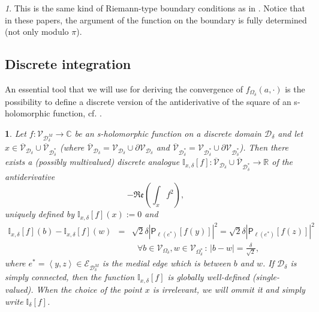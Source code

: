 \documentclass[oneside,english]{amsart}
\numberwithin{equation}{section}
\numberwithin{figure}{section}
\theoremstyle{plain}
\theoremstyle{plain}
\theoremstyle{plain}
\theoremstyle{plain}
\newtheorem{prop}[thm]{\protect\propositionname}
\theoremstyle{plain}
\theoremstyle{definition}
\theoremstyle{remark}
\newtheorem{rem}[thm]{\protect\remarkname}
\providecommand{\propositionname}{Proposition}
\providecommand{\remarkname}{Remark}
\begin{document}
\begin{rem}
This is the same kind of Riemann-type boundary conditions as in \cite{smirnov-ii,chelkak-smirnov-ii}.
Notice that in these papers, the argument of the function on the boundary
is fully determined (not only modulo $\pi$).
\end{rem}

\subsection{Discrete integration}

An essential tool that we will use for deriving the convergence of
$f_{\Omega_{\delta}}\left(a,\cdot\right)$ is the possibility to define
a discrete version of the antiderivative of the square of an s-holomorphic
function, cf. \cite{smirnov-ii}.
\begin{prop}
\label{pro:integral-of-the-square}Let $f:\mathcal{V}_{\mathcal{D}_{\delta}^{M}}\to\mathbb{C}$
be an s-holomorphic function on a discrete domain $\mathcal{D}_{\delta}$
and let $x\in\overline{\mathcal{V}}_{\mathcal{D}_{\delta}}\cup\overline{\mathcal{V}}_{\mathcal{D}_{\delta}^{*}}$
(where $\overline{\mathcal{V}}_{\mathcal{D}_{\delta}}=\mathcal{V}_{\mathcal{D}_{\delta}}\cup\partial\mathcal{V}_{\mathcal{D}_{\delta}}$
and $\overline{\mathcal{V}}_{\mathcal{D}_{\delta}^{*}}=\mathcal{V}_{\mathcal{D}_{\delta}^{*}}\cup\partial\mathcal{V}_{\mathcal{D}_{\delta}^{*}}$).
Then there exists a (possibly multivalued) discrete analogue $\mathbb{I}_{x,\delta}\left[f\right]:\overline{\mathcal{V}}_{\mathcal{D}_{\delta}}\cup\overline{\mathcal{V}}_{\mathcal{D}_{\delta}^{*}}\to\mathbb{R}$
of the antiderivative
\[
-\Re\mathfrak{e}\left(\int_{x}f^{2}\right),
\]
uniquely defined by $\mathbb{I}_{x,\delta}\left[f\right]\left(x\right):=0$
and
\begin{eqnarray*}
\mathbb{I}_{x,\delta}\left[f\right]\left(b\right)-\mathbb{I}_{x,\delta}\left[f\right]\left(w\right) & = & \sqrt{2}\delta\left|\mathsf{P}_{\ell\left(e^{*}\right)}\left[f\left(y\right)\right]\right|^{2}=\sqrt{2}\delta\left|\mathsf{P}_{\ell\left(e^{*}\right)}\left[f\left(z\right)\right]\right|^{2}\\
 &  & \,\,\,\,\forall b\in\mathcal{V}_{\Omega_{\delta}},w\in\mathcal{V}_{\Omega_{\delta}^{*}}\,:\,\left|b-w\right|=\frac{\delta}{\sqrt{2}},
\end{eqnarray*}
where $e^{*}=\left\langle y,z\right\rangle \in\mathcal{E}_{\mathcal{D}_{\delta}^{M}}$
is the medial edge which is between $b$ and $w$. If $\mathcal{D}_{\delta}$
is simply connected, then the function $\mathbb{I}_{x,\delta}\left[f\right]$
is globally well-defined (single-valued). When the choice of the point
$x$ is irrelevant, we will ommit it and simply write $\mathbb{I}_{\delta}\left[f\right]$.\end{prop}
\end{document}
